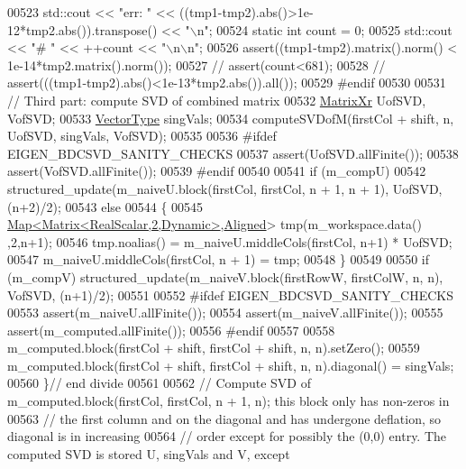 \begin{DoxyCode}
00523   std::cout << \textcolor{stringliteral}{"err:      "} << ((tmp1-tmp2).abs()>1e-12*tmp2.abs()).transpose() << \textcolor{stringliteral}{"\(\backslash\)n"};
00524   \textcolor{keyword}{static} \textcolor{keywordtype}{int} count = 0;
00525   std::cout << \textcolor{stringliteral}{"# "} << ++count << \textcolor{stringliteral}{"\(\backslash\)n\(\backslash\)n"};
00526   assert((tmp1-tmp2).matrix().norm() < 1e-14*tmp2.matrix().norm());
00527 \textcolor{comment}{//   assert(count<681);}
00528 \textcolor{comment}{//   assert(((tmp1-tmp2).abs()<1e-13*tmp2.abs()).all());}
00529 \textcolor{preprocessor}{#endif}
00530   
00531   \textcolor{comment}{// Third part: compute SVD of combined matrix}
00532   \hyperlink{group___core___module}{MatrixXr} UofSVD, VofSVD;
00533   \hyperlink{group___core___module}{VectorType} singVals;
00534   computeSVDofM(firstCol + shift, n, UofSVD, singVals, VofSVD);
00535   
00536 \textcolor{preprocessor}{#ifdef EIGEN\_BDCSVD\_SANITY\_CHECKS}
00537   assert(UofSVD.allFinite());
00538   assert(VofSVD.allFinite());
00539 \textcolor{preprocessor}{#endif}
00540   
00541   \textcolor{keywordflow}{if} (m\_compU)
00542     structured\_update(m\_naiveU.block(firstCol, firstCol, n + 1, n + 1), UofSVD, (n+2)/2);
00543   \textcolor{keywordflow}{else}
00544   \{
00545     \hyperlink{group___core___module_class_eigen_1_1_map}{Map<Matrix<RealScalar,2,Dynamic>},\hyperlink{group__enums_gga45fe06e29902b7a2773de05ba27b47a1ad37d4c71425bb286e9b4103830538fbf}{Aligned}> tmp(m\_workspace.data()
      ,2,n+1);
00546     tmp.noalias() = m\_naiveU.middleCols(firstCol, n+1) * UofSVD;
00547     m\_naiveU.middleCols(firstCol, n + 1) = tmp;
00548   \}
00549   
00550   \textcolor{keywordflow}{if} (m\_compV)  structured\_update(m\_naiveV.block(firstRowW, firstColW, n, n), VofSVD, (n+1)/2);
00551   
00552 \textcolor{preprocessor}{#ifdef EIGEN\_BDCSVD\_SANITY\_CHECKS}
00553   assert(m\_naiveU.allFinite());
00554   assert(m\_naiveV.allFinite());
00555   assert(m\_computed.allFinite());
00556 \textcolor{preprocessor}{#endif}
00557   
00558   m\_computed.block(firstCol + shift, firstCol + shift, n, n).setZero();
00559   m\_computed.block(firstCol + shift, firstCol + shift, n, n).diagonal() = singVals;
00560 \}\textcolor{comment}{// end divide}
00561 
00562 \textcolor{comment}{// Compute SVD of m\_computed.block(firstCol, firstCol, n + 1, n); this block only has non-zeros in}
00563 \textcolor{comment}{// the first column and on the diagonal and has undergone deflation, so diagonal is in increasing}
00564 \textcolor{comment}{// order except for possibly the (0,0) entry. The computed SVD is stored U, singVals and V, except}

\end{DoxyCode}
